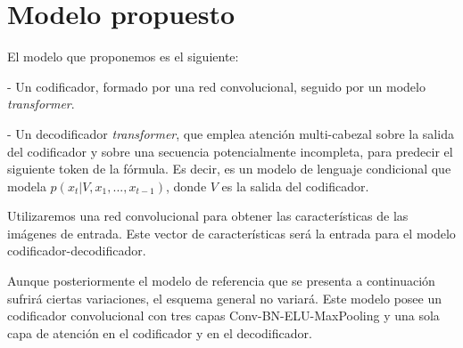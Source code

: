 \documentclass[a4paper, 20pt, dvipsnames]{article}
\begin{document}
\section{Modelo propuesto}

El modelo que proponemos es el siguiente:

- Un codificador, formado por una red convolucional, seguido por un modelo \emph{transformer}.

- Un decodificador \emph{transformer}, que emplea atención multi-cabezal sobre la salida del codificador y sobre una secuencia potencialmente incompleta, para predecir el siguiente token de la fórmula. Es decir, es un modelo de lenguaje condicional que modela $p(x_t | V, x_1, ..., x_{t-1})$, donde $V$ es la salida del codificador.

Utilizaremos una red convolucional para obtener las características de las imágenes de entrada. Este vector de características será la entrada para el modelo codificador-decodificador.

Aunque posteriormente el modelo de referencia que se presenta a continuación sufrirá ciertas variaciones, el esquema general no variará. Este modelo posee un codificador convolucional con tres capas Conv-BN-ELU-MaxPooling y una sola capa de atención en el codificador y en el decodificador.

\end{document}
